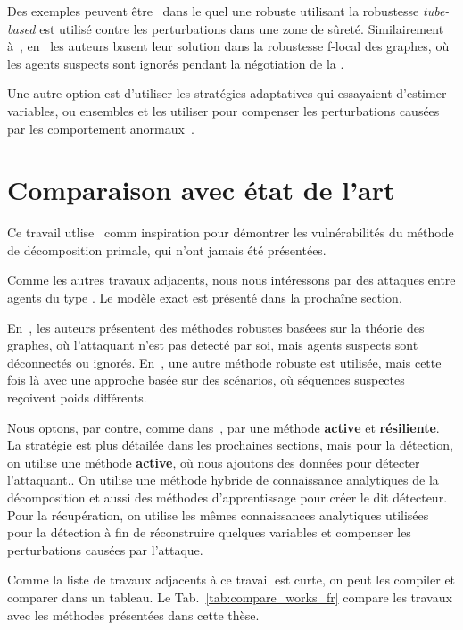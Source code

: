 \documentclass[../main.tex]{subfiles}
\begin{document}
Des exemples peuvent être~\cite{MaestreEtAl2018} dans le quel une \mpc{} robuste  utilisant la robustesse \emph{tube-based} est utilisé contre les perturbations dans une zone de sûreté.
Similairement à~\cite{VelardeEtAl2018}, en~\cite{AnandutaEtAl2018,AnandutaEtAl2019,AnandutaEtAl2020} les auteurs basent leur solution dans la robustesse f-local des graphes, où les agents suspects sont ignorés pendant la négotiation de la \dmpc{}.

Une autre option est d'utiliser les stratégies adaptatives qui essayaient d'estimer variables, ou ensembles et les utiliser pour compenser les perturbations causées par les comportement anormaux~\cite{YangEtAl2022,LuEtAl2020}.

\newpage
\section{Comparaison avec état de l'art}\label{sec:comp-avec-etat}
Ce travail utlise~\cite{VelardeEtAl2017b,ChanfreutEtAl2018} comm inspiration pour démontrer les vulnérabilités du méthode de décomposition primale, qui n'ont jamais été présentées.

Comme les autres travaux adjacents, nous nous intéressons par des attaques entre agents du type \textbf{\fdi{}}.
Le modèle exact est présenté dans la prochaîne section.

En~\cite{VelardeEtAl2017b,VelardeEtAl2018}, les auteurs présentent des méthodes robustes baséees sur la théorie des graphes, où l'attaquant n'est pas detecté par soi, mais agents suspects sont déconnectés ou ignorés.
En~\cite{VelardeEtAl2017a,MaestreEtAl2021}, une autre méthode robuste est utilisée, mais cette fois là avec une approche basée sur des scénarios, où séquences suspectes reçoivent poids différents.

Nous optons, par contre, comme dans~\cite{AnandutaEtAl2018,AnandutaEtAl2019,AnandutaEtAl2020}, par une méthode
\textbf{active} et \textbf{résiliente}.
La stratégie est plus détailée dans les prochaines sections, mais pour la détection, on utilise une méthode \textbf{active}, où nous ajoutons des données pour détecter l'attaquant..
On utilise une méthode hybride de connaissance analytiques de la décomposition et aussi des méthodes d'apprentissage pour créer le dit détecteur.
Pour la récupération, on utilise les mêmes connaissances analytiques utilisées pour la détection à fin de réconstruire quelques variables et compenser les perturbations causées par l'attaque.

Comme la liste de travaux adjacents à ce travail est curte, on peut les compiler et comparer dans un tableau.
Le Tab.~\ref{tab:compare_works_fr} compare les travaux avec les méthodes présentées dans cette thèse.
\end{document}
